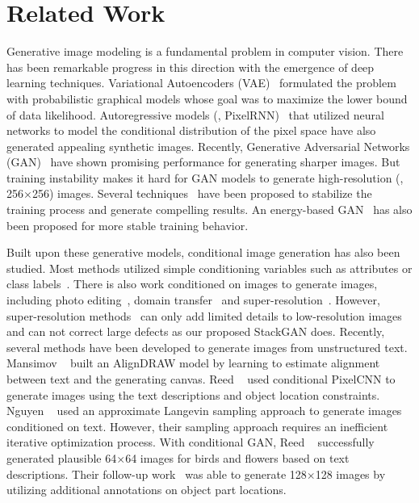 \documentclass[10pt,twocolumn,letterpaper]{article}
\begin{document}
\vspace{-2pt}
\section{Related Work}
 \vspace{-5pt}

Generative image modeling is a fundamental problem in computer vision. There has been remarkable progress in this direction with the emergence of deep learning techniques. Variational Autoencoders (VAE)~\cite{KingmaW14, RezendeMW14} formulated the problem with probabilistic graphical models whose goal was to maximize the lower bound of data likelihood. Autoregressive models (\eg, PixelRNN)~\cite{OordKK16} that utilized neural networks to model the conditional distribution of the pixel space have also generated appealing synthetic images. Recently, Generative Adversarial Networks (GAN)~\cite{goodfellow2014generative} have shown promising performance for generating sharper images. But training instability makes it hard for GAN models to generate high-resolution (\eg, 256$\times$256) images. Several techniques~\cite{Radford15, Salimans2016, MetzICLR17, ArjovskyB17, CheLJBL16} have been proposed to stabilize the training process and generate compelling results. An energy-based GAN~\cite{Zhao2016} has also been proposed for more stable training behavior.  

Built upon these generative models, conditional image generation has also been studied. Most methods utilized simple conditioning variables such as attributes or class labels~\cite{YanYSL16, Oord16, ChenDHSSA16, Odena2016}. There is also work conditioned on images to generate images, including photo editing~\cite{Brock2016, ZhuKSE16}, domain transfer~\cite{Taigmaniclr17, pix2pix2017} and super-resolution~\cite{Casper2016, Christian2016}. However, super-resolution methods~\cite{Casper2016, Christian2016} can only add limited details to low-resolution images and can not correct large defects as our proposed StackGAN does. Recently, several methods have been developed to generate images from unstructured text. Mansimov \etal~\cite{MansimovPBS15} built an AlignDRAW model by learning to estimate alignment between text and the generating canvas.  Reed \etal~\cite{reed2016iclr17} used conditional PixelCNN to generate images using the text descriptions and object location constraints. Nguyen \etal~\cite{NguyenYBDC17} used an approximate Langevin sampling approach to generate images conditioned on text. However, their sampling approach requires an inefficient iterative optimization process. With conditional GAN, Reed \etal~\cite{reed2016generative} successfully generated plausible 64$\times$64 images for birds and flowers based on text descriptions. Their follow-up work~\cite{reed2016learning} was able to generate 128$\times$128 images by utilizing additional annotations on object part locations.
\end{document}
